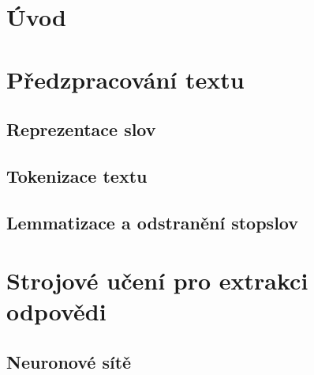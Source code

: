 
\chapter{Úvod}
\blindtext[4]




\chapter{Předzpracování textu}

\blindtext[2]
\section{Reprezentace slov}
\blindtext[4]
\section{Tokenizace textu}
\blindtext[3]
\section{Lemmatizace a odstranění stopslov}
\blindtext[3]




\chapter{Strojové učení pro extrakci odpovědi}

\blindtext[2]
\section{Neuronové sítě}
\blindtext[6]

